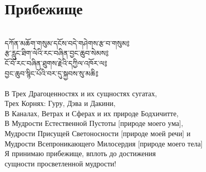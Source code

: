 \newpage
\section{Прибежище}
\\
\ti
དཀོན་མཆོག་གསུམ་དངོས་བདེ་གཤེགས་རྩ་བ་གསུམ༔\\
རྩ་རླུང་ཐིག་ལེའི་རང་བཞིན་བྱང་ཆུབ་སེམས༔\\
ངོ་བོ་རང་བཞིན་ཐུགས་རྗེའི་དཀྱིལ་འཁོར་ལ༔\\
བྱང་ཆུབ་སྙིང་པོའི་བར་དུ་སྐྱབས་སུ་མཆི༔\\
\\
\ru
В Трех Драгоценностях и их сущностях сугатах,\\
Трех Корнях: Гуру, Дэва и Дакини,\\
В Каналах, Ветрах и Сферах и их природе Бодхичитте,\\
В Мудрости Естественной Пустоты [природе моего ума],\\
Мудрости Присущей Светоносности [природе моей речи] и\\
Мудрости Всепроникающего Милосердия [природе моего тела]\\
Я принимаю прибежище, вплоть до достижения\\
\indent сущности просветленной мудрости!
